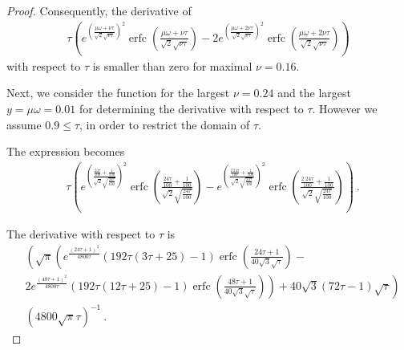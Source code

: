 \documentclass{article}
\renewcommand{\leq}{\leqslant}
\DeclareMathOperator{\erfc}{erfc}
\begin{document}
\begin{proof}
Consequently, the derivative of
\begin{align}
\label{eq:subx1a}
\tau \left(e^{\left(\frac{\mu \omega+\nu \tau}{\sqrt{2} \sqrt{\nu \tau}}\right)^2} \erfc \left(\frac{\mu \omega+\nu \tau}{\sqrt{2} \sqrt{\nu \tau}}\right)-2 e^{\left(\frac{\mu \omega+2  \nu \tau}{\sqrt{2} \sqrt{\nu \tau}}\right)^2} \erfc \left(\frac{\mu \omega+2  \nu \tau}{\sqrt{2} \sqrt{\nu \tau}}\right)\right)
\end{align}
with respect to $\tau$ is smaller than zero for maximal $\nu = 0.16$.

Next,
we consider the function for  
the largest $\nu = 0.24$ and the largest $y=\mu \omega = 0.01$ 
for determining the derivative with respect to $\tau$. 
However we assume $0.9 \leq \tau$, in order to restrict the
domain of $\tau$.

The expression becomes
\begin{align}
&\tau \left(e^{\left(\frac{\frac{24 \tau}{100}+\frac{1}{100}}{\sqrt{2} \sqrt{\frac{24 \tau}{100}}}\right)^2} \erfc \left(\frac{\frac{24 \tau}{100}+\frac{1}{100}}{\sqrt{2} \sqrt{\frac{24 \tau}{100}}}\right)-
e^{\left(\frac{\frac{2\ 24 \tau}{100}+\frac{1}{100}}{\sqrt{2} \sqrt{\frac{24 \tau}{100}}}\right)^2} \erfc \left(\frac{\frac{2\ 24 \tau}{100}+\frac{1}{100}}{\sqrt{2} \sqrt{\frac{24 \tau}{100}}}\right)\right) \ .
\end{align}

The derivative with respect to $\tau$ is 
\begin{align}
&\left(\sqrt{\pi } \left(e^{\frac{(24 \tau+1)^2}{4800 \tau}} (192  \tau (3 \tau+25)-1) \erfc \left(\frac{24 \tau+1}{40 \sqrt{3} \sqrt{\tau}}\right)-\right.\right.\\\nonumber 
&\left.\left.2 e^{\frac{(48 \tau+1)^2}{4800 \tau}} (192  \tau (12  \tau+25)-1) \erfc \left(\frac{48 \tau+1}{40 \sqrt{3} \sqrt{\tau}}\right)\right)+40 \sqrt{3} (72  \tau-1) \sqrt{\tau}\right)\\ \nonumber 
&\left(4800 \sqrt{\pi } \tau\right)^{-1} \ .
\end{align}


\end{proof}
\end{document}
